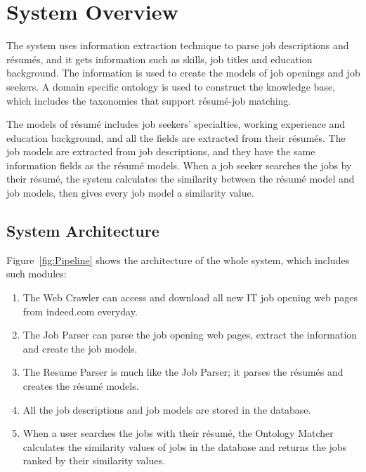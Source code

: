 \section{System Overview}
\label{sec1}

The system uses information extraction technique to parse job descriptions and r\'esum\'es, and it gets information such as skills, job titles and education background. The information is used to create the models of job openings and job seekers. A domain specific ontology is used to construct the knowledge base, which includes the taxonomies that support r\'esum\'e-job matching.

The models of r\'esum\'e includes job seekers' specialties, working experience and education background, and all the fields are extracted from their r\'esum\'es. The job models are extracted from job descriptions, and they have the same information fields as the r\'esum\'e models.  When a job seeker searches the jobs by their r\'esum\'e, the system calculates the similarity between the r\'esum\'e model and job models, then gives every job model a similarity value.

\subsection{System Architecture}

Figure~\ref{fig:Pipeline} shows the architecture of the whole system, which includes such modules:

\begin{enumerate}
    \item The Web Crawler can access and download all new IT job opening web pages from indeed.com everyday.
    \item The Job Parser can parse the job opening web pages, extract the information and create the job models.
    \item The Resume Parser is much like the Job Parser; it parses the r\'esum\'es and creates the r\'esum\'e models.
    \item All the job descriptions and job models are stored in the database.
    \item When a user searches  the jobs with their r\'esum\'e, the Ontology Matcher calculates the similarity values of jobs in the database and returns the jobs ranked by their similarity values.
\end{enumerate}

